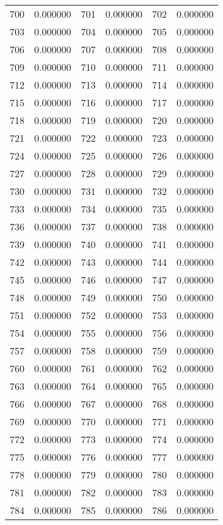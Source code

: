 \documentclass[12pt]{article}
\begin{document}
\begin{longtable}{@{}cc|cc|cc@{}}
700 & 0.000000 & 701 & 0.000000 & 702 & 0.000000 \\
703 & 0.000000 & 704 & 0.000000 & 705 & 0.000000 \\
706 & 0.000000 & 707 & 0.000000 & 708 & 0.000000 \\
709 & 0.000000 & 710 & 0.000000 & 711 & 0.000000 \\
712 & 0.000000 & 713 & 0.000000 & 714 & 0.000000 \\
715 & 0.000000 & 716 & 0.000000 & 717 & 0.000000 \\
718 & 0.000000 & 719 & 0.000000 & 720 & 0.000000 \\
721 & 0.000000 & 722 & 0.000000 & 723 & 0.000000 \\
724 & 0.000000 & 725 & 0.000000 & 726 & 0.000000 \\
727 & 0.000000 & 728 & 0.000000 & 729 & 0.000000 \\
730 & 0.000000 & 731 & 0.000000 & 732 & 0.000000 \\
733 & 0.000000 & 734 & 0.000000 & 735 & 0.000000 \\
736 & 0.000000 & 737 & 0.000000 & 738 & 0.000000 \\
739 & 0.000000 & 740 & 0.000000 & 741 & 0.000000 \\
742 & 0.000000 & 743 & 0.000000 & 744 & 0.000000 \\
745 & 0.000000 & 746 & 0.000000 & 747 & 0.000000 \\
748 & 0.000000 & 749 & 0.000000 & 750 & 0.000000 \\
751 & 0.000000 & 752 & 0.000000 & 753 & 0.000000 \\
754 & 0.000000 & 755 & 0.000000 & 756 & 0.000000 \\
757 & 0.000000 & 758 & 0.000000 & 759 & 0.000000 \\
760 & 0.000000 & 761 & 0.000000 & 762 & 0.000000 \\
763 & 0.000000 & 764 & 0.000000 & 765 & 0.000000 \\
766 & 0.000000 & 767 & 0.000000 & 768 & 0.000000 \\
769 & 0.000000 & 770 & 0.000000 & 771 & 0.000000 \\
772 & 0.000000 & 773 & 0.000000 & 774 & 0.000000 \\
775 & 0.000000 & 776 & 0.000000 & 777 & 0.000000 \\
778 & 0.000000 & 779 & 0.000000 & 780 & 0.000000 \\
781 & 0.000000 & 782 & 0.000000 & 783 & 0.000000 \\
784 & 0.000000 & 785 & 0.000000 & 786 & 0.000000 \\

\end{longtable}
\end{document}
